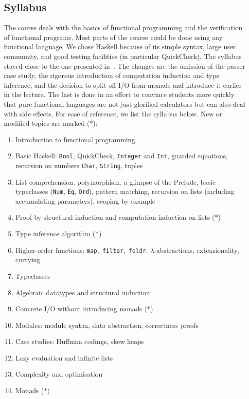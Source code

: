 \subsection{Syllabus\label{sec:syllabus}}

The course deals with the basics of functional programming and the verification of functional programs.
Most parts of the course could be done using any functional language.
We chose Haskell because of its simple syntax, large user community, and good testing facilities (in particular QuickCheck).
The syllabus stayed close to the one presented in~\cite{next_1100}.
The changes are the omission of the parser case study, the rigorous introduction of computation induction and type inference, and the decision to split off I/O from monads and introduce it earlier in the lecture.
The last is done in an effort to convince
students more quickly that pure functional languages are not just glorified calculators but can also deal with side effects.
For ease of reference, we list the syllabus below.
New or modified topics are marked ($\ast$):

\begin{multicols}{2}
\begin{enumerate}
  \item Introduction to functional programming
  \item Basic Haskell: \texttt{Bool}, QuickCheck, \texttt{Integer} and \texttt{Int}, guarded equations, recursion on numbers \texttt{Char}, \texttt{String}, tuples
  \item List comprehension, polymorphism, a glimpse of the Prelude, basic typeclasses (\texttt{Num}, \texttt{Eq}, \texttt{Ord}), pattern matching, recursion on lists (including accumulating parameters), scoping by example
  \item Proof by structural induction and computation induction on lists ($\ast$)
  \item Type inference algorithm ($\ast$)
  \item Higher-order functions: \texttt{map},~\texttt{filter},~\texttt{foldr}, $\lambda$-abstractions, extensionality, currying
  \item Typeclasses
  \item Algebraic datatypes and structural induction
  \item Concrete I/O without introducing monads ($\ast$)
  \item Modules: module syntax, data abstraction, correctness proofs
  \item Case studies: Huffman codings, skew heaps
  \item Lazy evaluation and infinite lists
  \item Complexity and optimisation
  \item Monads ($\ast$)
\end{enumerate}
\end{multicols}

